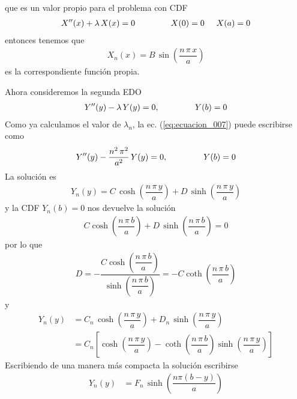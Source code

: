 que es un valor propio para el problema con CDF
\begin{align*}
X^{\prime \prime} (x) + \lambda \, X(x) = 0 \hspace{1.5cm} X(0) = 0 \hspace{0.5cm} X(a) = 0
\end{align*}
entonces tenemos que
\begin{align*}
X_{n} (x) = B \, \sin \left( \dfrac{n \, \pi \, x}{a} \right)
\end{align*}
es la correspondiente función propia.
\par
Ahora consideremos la segunda EDO
\begin{align}
Y^{\prime \prime} (y) - \lambda \,  Y(y) = 0, \hspace{1.5cm} Y(b) = 0
\label{eq:ecuacion_007}
\end{align}
Como ya calculamos el valor de $\lambda_{n}$, la ec. (\ref{eq:ecuacion_007}) puede escribirse como
\begin{align*}
Y^{\prime \prime} (y) -  \dfrac{n^{2} \, \pi^{2}}{a^{2}} \,  Y(y) = 0, \hspace{1.5cm} Y(b) = 0
\end{align*}
La solución es
\begin{align*}
Y_{n} (y) = C \, \cosh \left( \dfrac{n \, \pi \, y}{a} \right) + D \, \sinh \left( \dfrac{n \, \pi \, y}{a} \right)
\end{align*}
y la CDF $Y_{n}(b) = 0$ nos devuelve la solución
\begin{align*}
C \cosh \left( \dfrac{n \, \pi \, b}{a} \right) + D \, \sinh \left( \dfrac{n \, \pi \, b}{a} \right) = 0
\end{align*}
por lo que
\begin{align*}
D = - \dfrac{C \cosh \left( \dfrac{n \, \pi \, b}{a} \right)}{\sinh \left( \dfrac{n \, \pi \, b}{a} \right)} = - C \coth \left( \dfrac{n \, \pi \, b}{a} \right)
\end{align*}
y
\begin{align*}
Y_{n}(y) &= C_{n} \, \cosh \left( \dfrac{n \, \pi \, y}{a} \right) + D_{n} \, \sinh \left( \dfrac{n \, \pi \, y}{a} \right) \\
&= C_{n} \left[ \cosh \left( \dfrac{n \, \pi \, y}{a} \right) - \coth \left( \dfrac{n \, \pi \, b}{a} \right) \sinh \left( \dfrac{n \, \pi \, y}{a} \right) \right]
\end{align*}
Escribiendo de una manera más compacta la solución escribirse
\begin{align*}
Y_{n}(y) &= F_{n} \, \sinh \left( \dfrac{n \pi (b - y)}{a} \right)
\end{align*}
